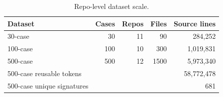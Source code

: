 \begin{table}[t]
\centering
\caption{Repo-level dataset scale.}
\label{tab:scalability}
\begin{tabular}{lrrrr}
\toprule
Dataset & Cases & Repos & Files & Source lines \\
\midrule
30-case & 30 & 11 & 90 & 284,252 \\
100-case & 100 & 10 & 300 & 1,019,831 \\
500-case & 500 & 12 & 1500 & 5,973,340 \\
\midrule
500-case reusable tokens & \multicolumn{4}{r}{58,772,478} \\
500-case unique signatures & \multicolumn{4}{r}{681} \\
\bottomrule
\end{tabular}
\end{table}

